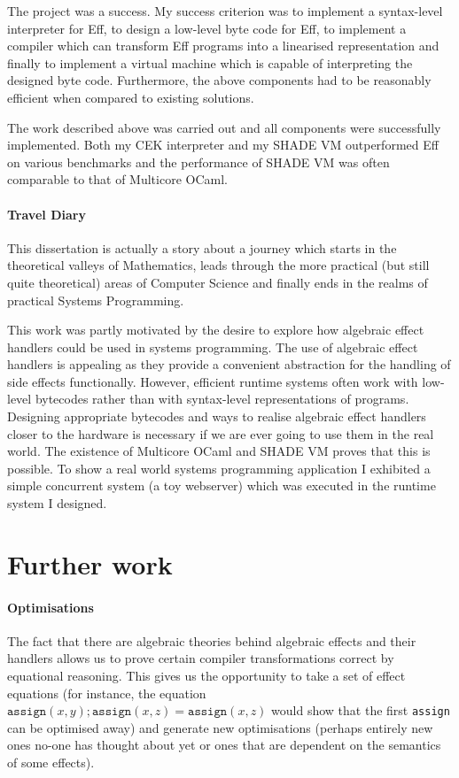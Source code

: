 \documentclass[class=article, crop=false]{standalone}
\begin{document}
The project was a success. My success criterion was to implement a 
syntax-level interpreter for Eff, to design a low-level byte code for Eff,
to implement a compiler which can transform Eff programs into a linearised
representation and finally to implement a virtual machine which is capable of
interpreting the designed byte code. Furthermore, the above components had to be
reasonably efficient when compared to existing solutions.

The work described above was carried out and all components were successfully
implemented. Both my CEK interpreter and my SHADE VM outperformed Eff on various
benchmarks and the performance of SHADE VM was often comparable to that of
Multicore OCaml.

\paragraph{Travel Diary}

This dissertation is actually a story about a journey
which starts in the theoretical valleys of Mathematics, leads through the more
practical (but still quite theoretical) areas of Computer Science and finally
ends in the realms of practical Systems Programming.

This work was partly motivated by the desire to explore how algebraic effect
handlers could be used in systems programming. The use of algebraic effect
handlers is appealing as they provide a convenient abstraction for the handling
of side effects functionally. However, efficient runtime systems often work
with low-level bytecodes rather than with syntax-level representations of
programs. Designing appropriate bytecodes and ways to realise algebraic effect
handlers closer to the hardware is necessary if we are ever
going to use them in the real world. The existence of Multicore OCaml and SHADE VM
proves that this is possible. To show a real world systems programming application
I exhibited a simple concurrent system (a toy webserver) which was executed
in the runtime system I designed. 

\section{Further work}

\paragraph{Optimisations}
The fact that there are algebraic theories behind algebraic effects and their
handlers allows us to prove certain compiler transformations correct by
equational reasoning. This gives us the opportunity to take a set of effect
equations (for instance, the equation $\mathtt{assign}(x,y); \mathtt{assign}(x,z) =
\mathtt{assign}(x, z)$ would show that the first \texttt{assign} can be optimised
away) and generate new optimisations (perhaps entirely new ones no-one has
thought about yet or ones that are dependent on the semantics of some effects).
\end{document}
